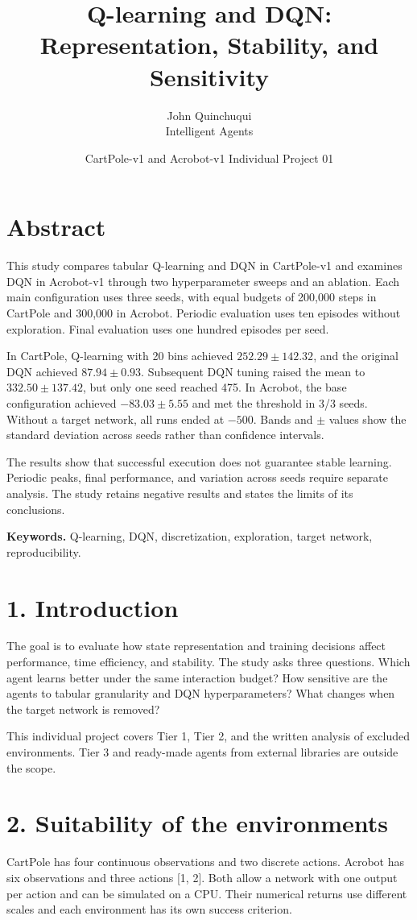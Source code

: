 \documentclass[10pt,a4paper,twocolumn]{extarticle}
\title{Q-learning and DQN: Representation, Stability, and Sensitivity}
\author{John Quinchuqui\\\small Intelligent Agents}
\date{\small CartPole-v1 and Acrobot-v1 \textbar{} Individual Project 01}
\begin{document}
\maketitle

\section*{Abstract}
This study compares tabular Q-learning and DQN in CartPole-v1 and examines DQN in Acrobot-v1 through two hyperparameter sweeps and an ablation. Each main configuration uses three seeds, with equal budgets of 200,000 steps in CartPole and 300,000 in Acrobot. Periodic evaluation uses ten episodes without exploration. Final evaluation uses one hundred episodes per seed.

In CartPole, Q-learning with 20 bins achieved $252.29\pm142.32$, and the original DQN achieved $87.94\pm0.93$. Subsequent DQN tuning raised the mean to $332.50\pm137.42$, but only one seed reached 475. In Acrobot, the base configuration achieved $-83.03\pm5.55$ and met the threshold in 3/3 seeds. Without a target network, all runs ended at $-500$. Bands and $\pm$ values show the standard deviation across seeds rather than confidence intervals.

The results show that successful execution does not guarantee stable learning. Periodic peaks, final performance, and variation across seeds require separate analysis. The study retains negative results and states the limits of its conclusions.

\textbf{Keywords.} Q-learning, DQN, discretization, exploration, target network, reproducibility.

\section*{1. Introduction}
The goal is to evaluate how state representation and training decisions affect performance, time efficiency, and stability. The study asks three questions. Which agent learns better under the same interaction budget? How sensitive are the agents to tabular granularity and DQN hyperparameters? What changes when the target network is removed?

This individual project covers Tier 1, Tier 2, and the written analysis of excluded environments. Tier 3 and ready-made agents from external libraries are outside the scope.

\newpage
\section*{2. Suitability of the environments}
CartPole has four continuous observations and two discrete actions. Acrobot has six observations and three actions [1, 2]. Both allow a network with one output per action and can be simulated on a CPU. Their numerical returns use different scales and each environment has its own success criterion.
\end{document}

